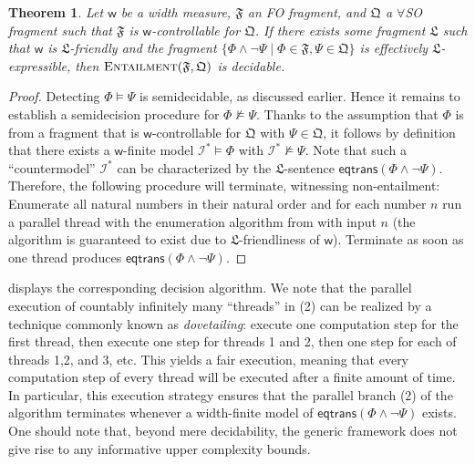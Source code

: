 \documentclass[10pt,a4paper]{amsart}
\theoremstyle{definition}
\numberwithin{equation}{section}
\theoremstyle{plain}
\newtheorem{theorem}[theorem]{Theorem}
\theoremstyle{definition}
\theoremstyle{myexample}
\theoremstyle{plain}
\theoremstyle{definition}
\newcommand{\instance}{\mathcal{I}}
\newcommand{\fcn}[1]{\mathsf{#1}}
\begin{document}
\begin{theorem}\label{thm:decidablequerying}
Let $\fcn{w}$ be a width measure,
$\mathfrak{F}$ an FO fragment, and 
$\mathfrak{Q}$ a $\forall$SO fragment 
such that $\mathfrak{F}$ is $\fcn{w}$-controllable for $\mathfrak{Q}$.
If there exists some fragment $\mathfrak{L}$ such that $\fcn{w}$ is $\mathfrak{L}$-friendly
and the fragment $\{\Phi \wedge \neg \Psi \mid \Phi \in \mathfrak{F}, \Psi \in \mathfrak{Q}\}$ is effectively 
$\mathfrak{L}$-expressible, then $\textsc{Entailment}(\mathfrak{F},\mathfrak{Q})$ is decidable.
\end{theorem}



\begin{proof}
Detecting $\Phi \models \Psi$ is semidecidable, as discussed earlier.
Hence it remains to establish a semidecision procedure for $\Phi \not\models \Psi$. 
Thanks to the assumption that $\Phi$ is from a fragment that is $\fcn{w}$-controllable for $\mathfrak{Q}$ with $\Psi \in \mathfrak{Q}$, it follows by definition that there exists a $\fcn{w}$-finite model $\instance^* \models \Phi$ with $\instance^* \not\models \Psi$.
Note that such a ``countermodel'' $\instance^*$ can be characterized by the $\mathfrak{L}$-sentence $\fcn{eqtrans}(\Phi \wedge \neg\Psi)$.  %
 Therefore, the following procedure will terminate, witnessing non-entailment: Enumerate all natural numbers in their natural order and for each number $n$ run a parallel thread with the enumeration algorithm from  with input $n$ (the algorithm is guaranteed to exist due to $\mathfrak{L}$-friendliness of $\fcn{w}$). Terminate as soon as one thread produces $\fcn{eqtrans}(\Phi \wedge \neg\Psi)$.\qedhere
\end{proof}

 displays the corresponding decision algorithm. We note that the parallel execution of countably infinitely many ``threads'' in (2) can be realized by a technique commonly known as \emph{dovetailing}: execute one computation step for the first thread, then execute one step for threads 1 and 2, then one step for each of threads 1,2, and 3, etc. This yields a fair execution, meaning that every computation step of every thread will be executed after a finite amount of time. In particular, this execution strategy ensures that the parallel branch (2) of the algorithm terminates whenever a width-finite model of $\fcn{eqtrans}(\Phi \wedge \neg\Psi)$ exists. One should note that, beyond mere decidability, the generic framework does not give rise to any informative upper complexity bounds.
\end{document}

